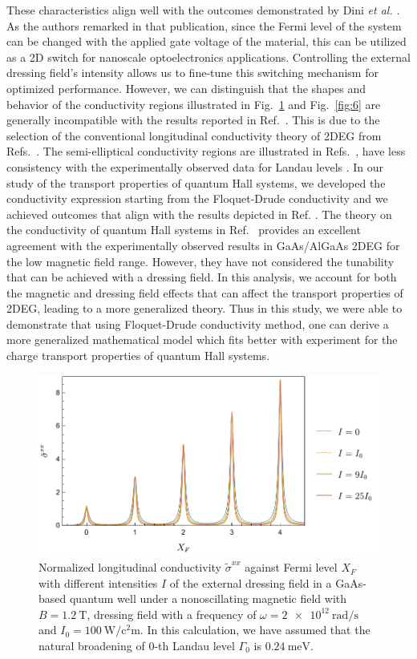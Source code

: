 These characteristics align well with the outcomes demonstrated by Dini \textit{et al.} \cite{dini16}.  As the authors remarked in that publication, since the Fermi level of the system can be changed with the applied gate voltage of the material, this can be utilized as a 2D switch for nanoscale optoelectronics applications. Controlling  the external dressing field's intensity allows us to fine-tune this switching mechanism for optimized performance.
However, we can distinguish that the shapes and behavior of the conductivity regions illustrated in Fig.~\ref{fig:5} and Fig.~\ref{fig:6} are generally incompatible with the results reported in Ref.~\cite{dini16}. This is due to the selection of the conventional longitudinal conductivity theory of 2DEG from Refs.~\cite{ando74_1,ando82}. The semi-elliptical conductivity regions are  illustrated in Refs.~\cite{dini16,ando74_1,ando82}, have less consistency with the experimentally observed data for Landau levels \cite{endo09}.
In our study of the transport properties of quantum Hall systems, we developed the conductivity expression starting from the Floquet-Drude conductivity \cite{wackerl20} and we achieved outcomes that align with the results depicted in Ref. \cite{endo09}.
The theory on the conductivity of quantum Hall systems in Ref.~\cite{endo09} provides an excellent agreement with the experimentally observed results in GaAs/AlGaAs 2DEG for the low magnetic field range.
However, they have not considered the tunability that can be achieved with a dressing field. In this analysis, we account for both the magnetic and dressing field effects that can affect the transport properties of 2DEG, leading to a more generalized theory. Thus in this study, we were able to demonstrate that using Floquet-Drude conductivity method, one can derive a more generalized mathematical model which fits better with experiment for the charge transport properties of quantum Hall systems.

\begin{figure}[t]
\includegraphics[scale=0.575]{figures/fig_4}
\caption{ Normalized longitudinal conductivity $\widetilde{\sigma}^{xx}$ against Fermi level $X_F$ with different intensities $I$ of the external dressing field in a GaAs-based quantum well under a nonoscillating magnetic field with $B = \SI{1.2}{\tesla}$, dressing field with a  frequency of $\omega =\SI{2e12}{\radian\per\second}$ and $I_0 =\SI{100}{\watt\per\square\centi\metre}$. In this calculation, we have assumed that the natural  broadening of $0$-th Landau level $\Gamma_0$ is $\SI{0.24}{\milli\eV}$.}
\label{fig:5}
\end{figure}

